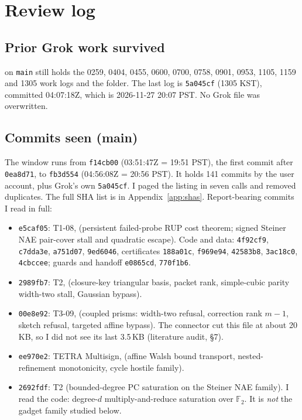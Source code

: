 \documentclass[11pt]{article}
\theoremstyle{definition}
\theoremstyle{remark}
\newcommand{\F}{\mathbb{F}}
\begin{document}
\section{Review log}
\subsection{Prior Grok work survived}
 on \texttt{main} still holds the 0259, 0404, 0455, 0600,
0700, 0758, 0901, 0953, 1105, 1159 and 1305 work logs and the  folder. The last
log is \texttt{5a045cf} (1305 KST), committed 04:07:18Z, which is 2026-11-27 20:07 PST. No
Grok file was overwritten.

\subsection{Commits seen (main)}
The window runs from \texttt{f14cb00} (03:51:47Z = 19:51 PST), the first commit after
\texttt{0ea8d71}, to \texttt{fb3d554} (04:56:08Z = 20:56 PST). It holds 141 commits by the
user account, plus Grok's own \texttt{5a045cf}. I paged the listing in seven calls and removed
duplicates. The full SHA list is in Appendix~\ref{app:shas}. Report-bearing commits I read in
full:
\begin{itemize}
\item \texttt{e5caf05}: T1-08,
(persistent failed-probe RUP cost theorem; signed Steiner NAE pair-cover stall and quadratic
escape). Code and data: \texttt{4f92cf9}, \texttt{c7dda3e}, \texttt{a751d07},
\texttt{9ed6046}, certificates \texttt{188a01c}, \texttt{f969e94}, \texttt{42583b8},
\texttt{3ac18c0}, \texttt{4cbccee}; guards and handoff \texttt{e0865cd}, \texttt{770f1b6}.
\item \texttt{2989fb7}: T2,
(closure-key triangular basis, packet rank, simple-cubic parity width-two stall, Gaussian
bypass).
\item \texttt{00e8e92}: T3-09,
(coupled prisms: width-two refusal, correction rank $m-1$, sketch refusal, targeted affine
bypass). The connector cut this file at about 20\,KB, so I did not see its last 3.5\,KB
(literature audit, \S7).
\item \texttt{ee970e2}: TETRA Multisign,
 (affine Walsh
bound transport, nested-refinement monotonicity, cycle hostile family).
\item \texttt{2692fdf}: T2  (bounded-degree PC saturation on the Steiner NAE
family). I read the code: degree-$d$ multiply-and-reduce saturation over $\F_2$. It is
\emph{not} the gadget family studied below.
\end{itemize}
\end{document}
